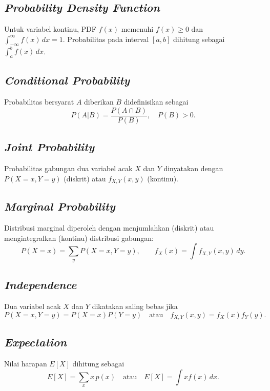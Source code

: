 \subsection{\textit{Probability Density Function}}
Untuk variabel kontinu, PDF \(f(x)\) memenuhi \(f(x) \ge 0\) dan \(\int_{-\infty}^{\infty} f(x)\,dx = 1\). Probabilitas pada interval \([a,b]\) dihitung sebagai \(\int_a^b f(x)\,dx\).

\subsection{\textit{Conditional Probability}}
Probabilitas bersyarat \(A\) diberikan \(B\) didefinisikan sebagai
\begin{equation}
P(A|B) = \frac{P(A \cap B)}{P(B)}, \quad P(B) > 0.
\end{equation}

\subsection{\textit{Joint Probability}}
Probabilitas gabungan dua variabel acak \(X\) dan \(Y\) dinyatakan dengan \(P(X=x, Y=y)\) (diskrit) atau \(f_{X,Y}(x,y)\) (kontinu).

\subsection{\textit{Marginal Probability}}
Distribusi marginal diperoleh dengan menjumlahkan (diskrit) atau mengintegralkan (kontinu) distribusi gabungan:
\begin{equation}
P(X=x) = \sum_y P(X=x, Y=y), \qquad f_X(x) = \int f_{X,Y}(x,y)\,dy.
\end{equation}

\subsection{\textit{Independence}}
Dua variabel acak \(X\) dan \(Y\) dikatakan saling bebas jika
\begin{equation}
P(X=x, Y=y) = P(X=x)P(Y=y) \quad \text{atau} \quad f_{X,Y}(x,y)=f_X(x)f_Y(y).
\end{equation}

\subsection{\textit{Expectation}}
Nilai harapan \(E[X]\) dihitung sebagai
\begin{equation}
E[X] = \sum_x x\,p(x) \quad \text{atau} \quad E[X] = \int x f(x)\,dx.
\end{equation}

